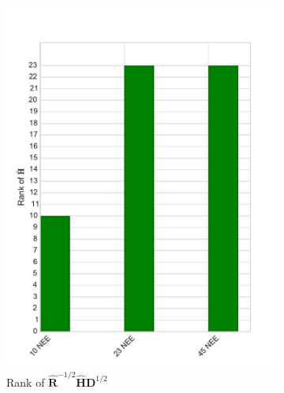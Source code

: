 \begin{figure}[ht]
    \centering
    \begin{subfigure}[b]{0.4\textwidth}
        \includegraphics[width=\textwidth]{chapter/chapter5/dalec2_obsrankcvt.pdf}
        \caption{Rank of $\hat{\textbf{R}}^{-1/2}\hat{\textbf{H}}\textbf{D}^{1/2}$}
        \label{chap5:fig:D2_observailityrankcvt}
    \end{subfigure}
    \begin{subfigure}[b]{0.4\textwidth}

\end{subfigure}
\end{figure}
